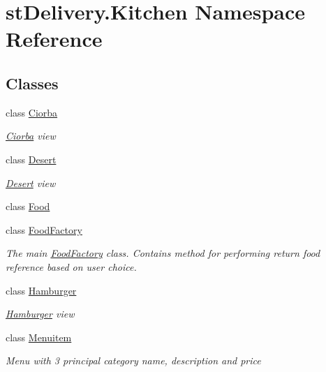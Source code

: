 \hypertarget{namespacest_delivery_1_1_kitchen}{}\section{st\+Delivery.\+Kitchen Namespace Reference}
\label{namespacest_delivery_1_1_kitchen}
\subsection*{Classes}
\begin{DoxyCompactItemize}
\item 
class \hyperlink{classst_delivery_1_1_kitchen_1_1_ciorba}{Ciorba}
\begin{DoxyCompactList}\small\item\em \hyperlink{classst_delivery_1_1_kitchen_1_1_ciorba}{Ciorba} view \end{DoxyCompactList}\item 
class \hyperlink{classst_delivery_1_1_kitchen_1_1_desert}{Desert}
\begin{DoxyCompactList}\small\item\em \hyperlink{classst_delivery_1_1_kitchen_1_1_desert}{Desert} view \end{DoxyCompactList}\item 
class \hyperlink{classst_delivery_1_1_kitchen_1_1_food}{Food}
\item 
class \hyperlink{classst_delivery_1_1_kitchen_1_1_food_factory}{Food\+Factory}
\begin{DoxyCompactList}\small\item\em The main \hyperlink{classst_delivery_1_1_kitchen_1_1_food_factory}{Food\+Factory} class. Contains method for performing return food reference based on user choice. \end{DoxyCompactList}\item 
class \hyperlink{classst_delivery_1_1_kitchen_1_1_hamburger}{Hamburger}
\begin{DoxyCompactList}\small\item\em \hyperlink{classst_delivery_1_1_kitchen_1_1_hamburger}{Hamburger} view \end{DoxyCompactList}\item 
class \hyperlink{classst_delivery_1_1_kitchen_1_1_menuitem}{Menuitem}
\begin{DoxyCompactList}\small\item\em Menu with 3 principal category name, description and price \end{DoxyCompactList}\item 

\end{DoxyCompactItemize}
